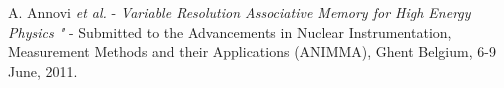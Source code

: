 \documentclass[10pt,a4paper]{article}
\begin{document}
\begin{thebibliography}{99}
 A. Annovi {\it et al.}  - {\it Variable Resolution Associative Memory for High Energy Physics
"} - Submitted to the Advancements in Nuclear Instrumentation, Measurement Methods and their Applications (ANIMMA), Ghent Belgium, 6-9 June, 2011.



\end{thebibliography}


\end{document}
